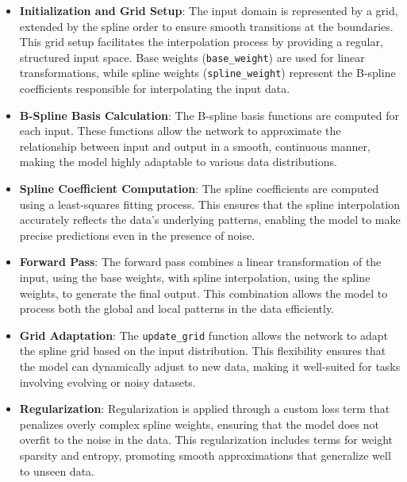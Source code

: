 \documentclass[conference]{IEEEtran}
\begin{document}
\begin{itemize}
    \item \textbf{Initialization and Grid Setup}: The input domain is represented by a grid, extended by the spline order to ensure smooth transitions at the boundaries. This grid setup facilitates the interpolation process by providing a regular, structured input space. Base weights (\texttt{base\_weight}) are used for linear transformations, while spline weights (\texttt{spline\_weight}) represent the B-spline coefficients responsible for interpolating the input data.

    \item \textbf{B-Spline Basis Calculation}: The B-spline basis functions are computed for each input. These functions allow the network to approximate the relationship between input and output in a smooth, continuous manner, making the model highly adaptable to various data distributions.

    \item \textbf{Spline Coefficient Computation}: The spline coefficients are computed using a least-squares fitting process. This ensures that the spline interpolation accurately reflects the data's underlying patterns, enabling the model to make precise predictions even in the presence of noise.

    \item \textbf{Forward Pass}: The forward pass combines a linear transformation of the input, using the base weights, with spline interpolation, using the spline weights, to generate the final output. This combination allows the model to process both the global and local patterns in the data efficiently.

    \item \textbf{Grid Adaptation}: The \texttt{update\_grid} function allows the network to adapt the spline grid based on the input distribution. This flexibility ensures that the model can dynamically adjust to new data, making it well-suited for tasks involving evolving or noisy datasets.

    \item \textbf{Regularization}: Regularization is applied through a custom loss term that penalizes overly complex spline weights, ensuring that the model does not overfit to the noise in the data. This regularization includes terms for weight sparsity and entropy, promoting smooth approximations that generalize well to unseen data.
\end{itemize}
\end{document}
